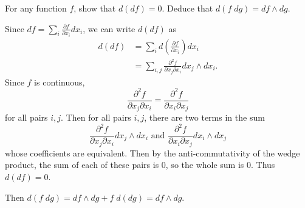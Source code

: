 \documentclass[10pt]{report}
\begin{document}
\begin{exer}[1.6.3]
	For any function $f$, show that $d(df)=0.$ Deduce that $d(f\;dg)=df\wedge dg$.
\end{exer}
Since $df= \sum_i \frac{\partial f}{\partial x_i} dx_i$, we can write $d(df)$ as
\begin{align*}
	d(df) &= \sum_i d\left( \frac{\partial f}{\partial x_i}  \right)dx_i \\
	      &= \sum_{i,j}\frac{\partial^2 f}{\partial x_j \partial x_i} dx_j \wedge dx_i.
\end{align*}
Since $f$ is continuous,
\[
\frac{\partial^2 f}{\partial x_j \partial x_i} = \frac{\partial^2 f}{\partial x_i \partial x_j}
\] for all pairs $i,j$. Then for all pairs $i,j$, there are two terms in the sum
\[
	\frac{\partial^2 f}{\partial x_j \partial x_i} dx_j \wedge dx_i \text{ and } \frac{\partial^2 f}{\partial x_i \partial x_j} dx_i \wedge dx_j
\] whose coefficients are equivalent. Then by the anti-commutativity of the wedge product, the sum of each of these pairs is 0, so the whole sum is 0. Thus $d(df)=0$.

Then $d(f\;dg) = df\wedge dg + f\;d(dg) = df\wedge dg$.
\end{document}
